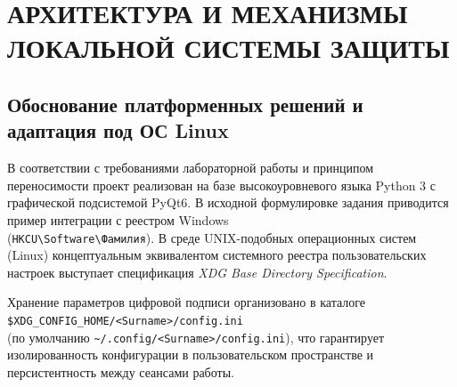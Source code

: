 \documentclass[a4paper]{article}
\begin{document}
\newpage
\section{АРХИТЕКТУРА И МЕХАНИЗМЫ ЛОКАЛЬНОЙ СИСТЕМЫ ЗАЩИТЫ}

\subsection{Обоснование платформенных решений и адаптация под ОС Linux}
В соответствии с требованиями лабораторной работы и принципом переносимости проект реализован на базе высокоуровневого языка Python 3 с графической подсистемой PyQt6. В исходной формулировке задания приводится пример интеграции с реестром Windows \\ (\texttt{HKCU\textbackslash Software\textbackslash Фамилия}). В среде UNIX-подобных операционных систем (Linux) концептуальным эквивалентом системного реестра пользовательских настроек выступает спецификация \textit{XDG Base Directory Specification}.

Хранение параметров цифровой подписи организовано в каталоге \\ \texttt{\$XDG\_CONFIG\_HOME/<Surname>/config.ini} \\ (по умолчанию \texttt{\textasciitilde/.config/<Surname>/config.ini}), что гарантирует изолированность конфигурации в пользовательском пространстве и персистентность между сеансами работы.
\end{document}
